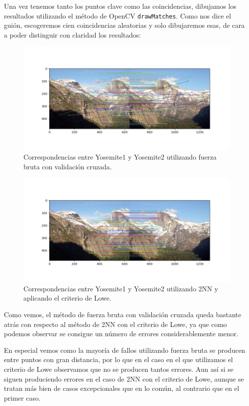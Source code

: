\documentclass[12pt, spanish]{article}
\begin{document}
Una vez tenemos tanto los puntos clave como las coincidencias, dibujamos los resultados utilizando el método de OpenCV \texttt{drawMatches}. Como nos dice el guión, escogeremos cien coincidencias aleatorias y solo dibujaremos esas, de cara a poder distinguir con claridad los resultados:

\begin{figure}[H]
  \centering
      \includegraphics[width=\textwidth]{correspondencias_fuerza_bruta.png}
 		\caption{Correspondencias entre Yosemite1 y Yosemite2 utilizando fuerza bruta con validación cruzada.}
\end{figure}

\begin{figure}[H]
  \centering
      \includegraphics[width=\textwidth]{correspondencias_lowe_2nn.png}
 		\caption{Correspondencias entre Yosemite1 y Yosemite2 utilizando 2NN y aplicando el criterio de Lowe.}
\end{figure}


Como vemos, el método de fuerza bruta con validación cruzada queda bastante atrás con respecto al método de 2NN con el criterio de Lowe, ya que como podemos observar se consigue un número de errores considerablemente menor.

En especial vemos como la mayoría de fallos utilizando fuerza bruta se producen entre puntos con gran distancia, por lo que en el caso en el que utilizamos el criterio de Lowe observamos que no se producen tantos errores. Aun así si se siguen produciendo errores en el caso de 2NN con el criterio de Lowe, aunque se tratan más bien de casos excepcionales que en lo común, al contrario que en el primer caso.
\end{document}
